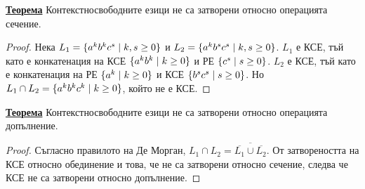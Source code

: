 \documentclass{article}
\begin{document}
\textbf{\underline{Теорема}} \newline
Контекстносвободните езици не са затворени относно операцията сечение.
\begin{proof}
Нека $L_1 = \{a^kb^kc^s \hspace{0.1cm} | \hspace{0.1cm} k,s \geq 0\}$ и $L_2 = \{a^kb^sc^s \hspace{0.1cm} | \hspace{0.1cm} k,s \geq 0\}$.
$L_1$ е КСЕ, тъй като е конкатенация на КСЕ $\{a^kb^k \hspace{0.1cm} | \hspace{0.1cm} k \geq 0\}$ и РЕ $\{c^s \hspace{0.1cm}
| \hspace{0.1cm} s \geq 0\}$. $L_2$ е КСЕ, тъй като е конкатенация на РЕ $\{a^k \hspace{0.1cm} | \hspace{0.1cm} k \geq 0\}$
и КСЕ $\{b^sc^s \hspace{0.1cm} | \hspace{0.1cm} s \geq 0\}$. Но $L_1 \cap L_2 = \{a^kb^kc^k \hspace{0.1cm} | \hspace{0.1cm} k \geq 0 \}$, който не е КСЕ.
\end{proof}
\textbf{\underline{Теорема}} \newline
Контекстносвободните езици не са затворени относно операцията допълнение.
\begin{proof}
Съгласно правилото на Де Морган, $L_1 \cap L_2 = \overline{{\overline{L_1} \cup \overline{L_2}}}$. От затвореността на КСЕ относно
обединение и това, че не са затворени относно сечение, следва че КСЕ не са затворени относно допълнение.
\end{proof}
\section*{\centering \color{lightBlue}{Дизайн и анализ на алгоритми}}

\subsection*{\color{lightBlue}{6. Сложност на алгоритъм. Асимптотично поведение на целочислени функции 
($O$-, $\Omega$-, $\Theta$-, $o$- и $\omega$-нотация). Сложност на рекурсивни програми.}}
\end{document}
